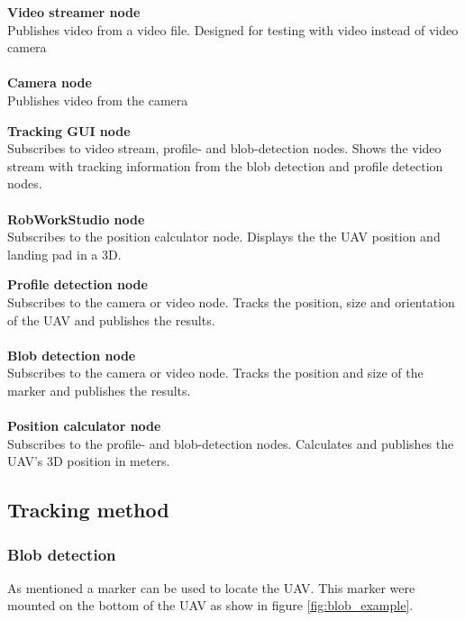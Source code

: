 \begin{center}
	\begin{minipage}[t]{0.19\textwidth}
		\textbf{Video streamer node}\\Publishes video from a video file. Designed for testing with video instead of video camera\\\\
		\textbf{Camera node}\\Publishes video from the camera
	\end{minipage}
	\hfill
	\begin{minipage}[t]{0.30\textwidth}
		\textbf{Tracking GUI node}\\Subscribes to video stream, profile- and blob-detection nodes. Shows the video stream with tracking information from the blob detection and profile detection nodes. \\\\
		\textbf{RobWorkStudio node}\\Subscribes to the position calculator node. Displays the the UAV position and landing pad in a 3D.
	\end{minipage}
	\hfill
	\begin{minipage}[t]{0.44\textwidth}
		\textbf{Profile detection node}\\Subscribes to the camera or video node. Tracks the position, size and orientation of the UAV and publishes the results.\\\\
		\textbf{Blob detection node}\\Subscribes to the camera or video node. Tracks the position and size of the marker and publishes the results.\\\\
		\textbf{Position calculator node}\\Subscribes to the profile- and blob-detection nodes. Calculates and publishes the UAV's 3D position in meters.
	\end{minipage}
\end{center}
\subsection{Tracking method}
\subsubsection{Blob detection}
As mentioned a marker can be used to locate the UAV. This marker were mounted on the bottom of the UAV as show in figure \vref{fig:blob_example}. 

